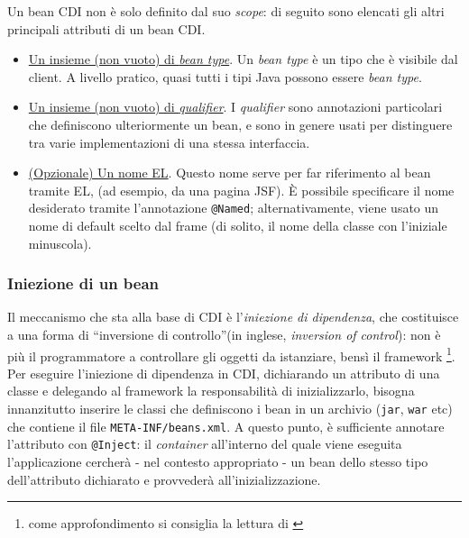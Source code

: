Un bean CDI non è solo definito dal suo \textit{scope}: di seguito sono elencati gli altri principali attributi di un bean CDI.
\begin{itemize}
\item \underline{Un insieme (non vuoto) di \textit{bean type}}. Un \textit{bean type} è un tipo che è visibile dal client. A livello pratico, quasi tutti i tipi Java possono essere \textit{bean type}.
\item \underline{Un insieme (non vuoto) di \textit{qualifier}}. I \textit{qualifier} sono annotazioni particolari che definiscono ulteriormente un bean, e sono in genere usati per distinguere tra varie implementazioni di una stessa interfaccia.
\item \underline{(Opzionale) Un nome EL}. Questo nome serve per far riferimento al bean tramite EL, (ad esempio, da una pagina JSF). È possibile specificare il nome desiderato tramite l'annotazione \lstinline{@Named}; alternativamente, viene usato un nome di default scelto dal frame (di solito, il nome della classe con l'iniziale minuscola).
\end{itemize}

\subsubsection{Iniezione di un bean}
Il meccanismo che sta alla base di CDI è l'\textsl{iniezione di dipendenza}, che costituisce a una forma di \textquotedblleft inversione di controllo\textquotedblright (in inglese, \textit{inversion of control}): non è più il programmatore a controllare gli oggetti da istanziare, bensì il framework \footnote{come approfondimento si consiglia la lettura di \cite{inversion}}.\\
Per eseguire l'iniezione di dipendenza in CDI, dichiarando un attributo di una classe e delegando al framework la responsabilità di inizializzarlo, bisogna innanzitutto inserire le classi che definiscono i bean in un archivio (\texttt{jar}, \texttt{war} etc) che contiene il file \texttt{META-INF/beans.xml}. A questo punto, è sufficiente annotare l'attributo con \lstinline{@Inject}: il \textit{container} all'interno del quale viene eseguita l'applicazione cercherà - nel contesto appropriato - un bean dello stesso tipo dell'attributo dichiarato e provvederà all'inizializzazione.\\

